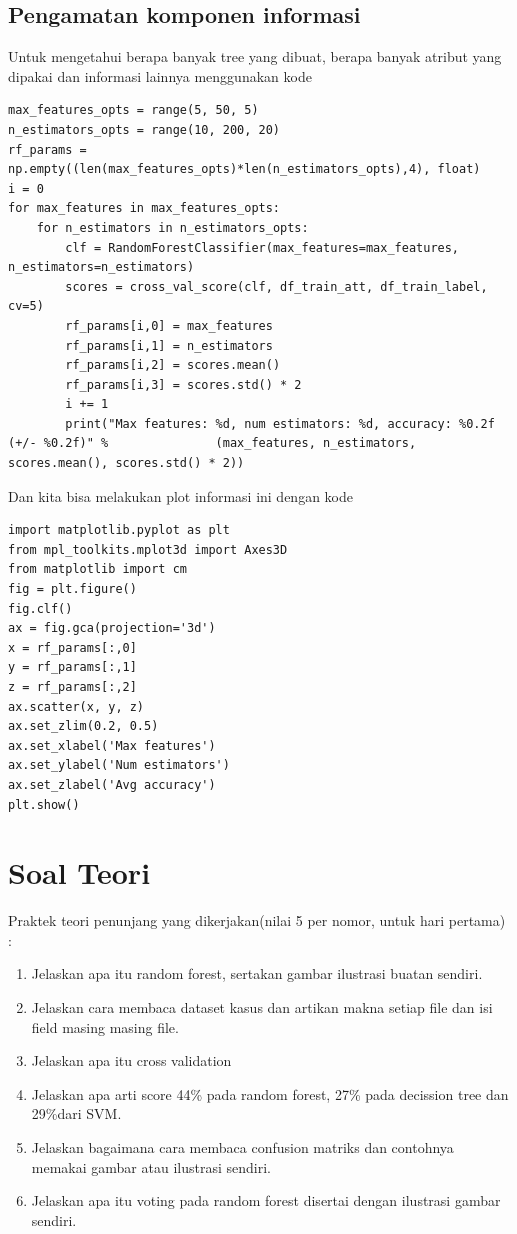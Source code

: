 \subsection{Pengamatan komponen informasi}
Untuk mengetahui berapa banyak tree yang dibuat, berapa banyak atribut yang dipakai dan informasi lainnya menggunakan kode
\begin{lstlisting}[caption=Melakukan Pengamatan komponen informasi,label={lst:3.24}]
max_features_opts = range(5, 50, 5)
n_estimators_opts = range(10, 200, 20)
rf_params = np.empty((len(max_features_opts)*len(n_estimators_opts),4), float)
i = 0
for max_features in max_features_opts:
    for n_estimators in n_estimators_opts:
        clf = RandomForestClassifier(max_features=max_features, n_estimators=n_estimators)
        scores = cross_val_score(clf, df_train_att, df_train_label, cv=5)
        rf_params[i,0] = max_features
        rf_params[i,1] = n_estimators
        rf_params[i,2] = scores.mean()
        rf_params[i,3] = scores.std() * 2
        i += 1
        print("Max features: %d, num estimators: %d, accuracy: %0.2f (+/- %0.2f)" %               (max_features, n_estimators, scores.mean(), scores.std() * 2))

\end{lstlisting}
Dan kita bisa melakukan plot informasi ini dengan kode
\begin{lstlisting}[caption=Plot Komponen informasi agar bisa dibaca,label={lst:3.25}]
import matplotlib.pyplot as plt
from mpl_toolkits.mplot3d import Axes3D
from matplotlib import cm
fig = plt.figure()
fig.clf()
ax = fig.gca(projection='3d')
x = rf_params[:,0]
y = rf_params[:,1]
z = rf_params[:,2]
ax.scatter(x, y, z)
ax.set_zlim(0.2, 0.5)
ax.set_xlabel('Max features')
ax.set_ylabel('Num estimators')
ax.set_zlabel('Avg accuracy')
plt.show()
\end{lstlisting}




\section{Soal Teori}
Praktek teori penunjang yang dikerjakan(nilai 5 per nomor, untuk hari pertama) :
\begin{enumerate}
\item
Jelaskan apa itu random forest, sertakan gambar ilustrasi buatan sendiri.
\item
Jelaskan cara membaca dataset kasus dan artikan makna setiap file dan isi field masing masing file.
\item
Jelaskan apa itu cross validation
\item
Jelaskan apa arti score 44\% pada random forest, 27\% pada decission tree dan 29\%dari SVM.
\item
Jelaskan bagaimana cara membaca confusion matriks dan contohnya memakai gambar atau ilustrasi sendiri.
\item
Jelaskan apa itu voting pada random forest disertai dengan ilustrasi gambar sendiri.
\end{enumerate}

